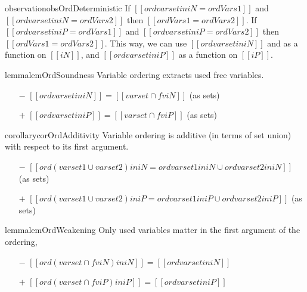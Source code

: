 \begin{restatable}{observation}{obsOrdDeterministic}
    \label{obs:ord-deterministic}
    If $[[ord varset in iN = ordVars1]]$ and $[[ord varset in iN = ordVars2]]$ then $[[ordVars1 = ordVars2]]$.
    If $[[ord varset in iP = ordVars1]]$ and $[[ord varset in iP = ordVars2]]$ then $[[ordVars1 = ordVars2]]$.
    This way, we can use $[[ord varset in iN]]$ and as a function on $[[iN]]$,
    and $[[ord varset in iP]]$ as a function on $[[iP]]$.
\end{restatable}

\begin{restatable}{lemma}{lemOrdSoundness}
  \label{lemma:ord-soundness}
  Variable ordering extracts used free variables.
  \begin{itemize}
    \item[$-$] $[[ {ord varset in iN} ]] = [[varset ∩ fv iN]]$ (as sets)
    \item[$+$] $[[ {ord varset in iP} ]] = [[varset ∩ fv iP]]$ (as sets)
  \end{itemize}
\end{restatable}

\begin{restatable}{corollary}{corOrdAdditivity}
  \label{corollary:ord-additivity}
  Variable ordering is additive (in terms of set union) with respect to its first argument.
  \begin{itemize}
    \item[$-$] $[[ {ord (varset1 ∪ varset2) in iN} 
                = 
                {ord varset1 in iN} ∪ {ord varset2 in iN}]]$ (as sets)
    \item[$+$] $[[{ord (varset1 ∪ varset2) in iP}
                =
                {ord varset1 in iP} ∪ {ord varset2 in iP}]]$ (as sets)

  \end{itemize}
\end{restatable}

\begin{restatable}{lemma}{lemOrdWeakening}
  \label{corollary:ord-weakening}
  Only used variables matter in the first argument of the ordering,
  \begin{itemize}
    \item[$-$] $[[ ord (varset ∩ fv iN) in iN ]] = [[ ord varset in iN ]]$
    \item[$+$] $[[ ord (varset ∩ fv iP) in iP ]] = [[ ord varset in iP ]]$
  \end{itemize}
\end{restatable}


